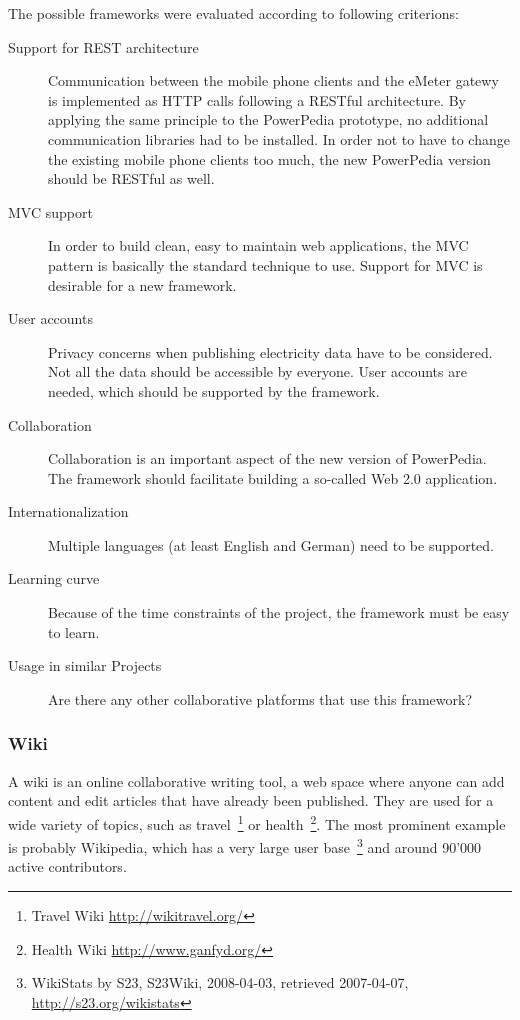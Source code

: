 The possible frameworks were evaluated according to following criterions:
\begin{description}
 \item[Support for REST architecture] Communication between the mobile phone clients and the eMeter gatewy is implemented as HTTP calls following a RESTful architecture. By applying the same principle to the PowerPedia prototype, no additional communication libraries had to be installed. In order not to have to change the existing mobile phone clients too much, the new PowerPedia version should be RESTful as well.
 \item[MVC support] In order to build clean, easy to maintain web applications, the MVC pattern is basically the standard technique to use. Support for MVC is desirable for a new framework. 
 \item[User accounts] Privacy concerns when publishing electricity data have to be considered. Not all the data should be accessible by everyone. User accounts are needed, which should be supported by the framework.
 \item[Collaboration] Collaboration is an important aspect of the new version of PowerPedia. The framework should facilitate building a so-called Web 2.0 application.
 \item[Internationalization] Multiple languages (at least English and German) need to be supported.
 \item[Learning curve] Because of the time constraints of the project, the framework must be easy to learn.  
 \item[Usage in similar Projects] Are there any other collaborative platforms that use this framework?
\end{description}

\subsubsection{Wiki}
A wiki is an online collaborative writing tool, a web space where anyone can add content and edit articles that have already been published\cite{wikis_collaboration}. 
They are used for a wide variety of topics, such as travel~\footnote{Travel Wiki \url{http://wikitravel.org/}} or health~\footnote{Health Wiki \url{http://www.ganfyd.org/}}. The most prominent example is probably Wikipedia, which has a very large user base~\footnote{WikiStats by S23, S23Wiki, 2008-04-03, retrieved 2007-04-07, \url{http://s23.org/wikistats}} and around 90'000 active contributors.

